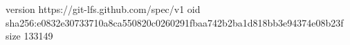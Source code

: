 version https://git-lfs.github.com/spec/v1
oid sha256:e0832e30733710a8ca550820c0260291fbaa742b2ba1d818bb3e94374e08b23f
size 133149
